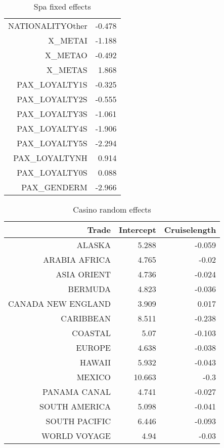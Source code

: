 \documentclass{article}
\begin{document}
\begin{table}[H]
\begin{tabular}{rr}
	NATIONALITYOther	 &                 -0.478        \\          
	X\_METAI	                 &             -1.188            \\      
	X\_METAO	                 &            -0.492             \\     
	X\_METAS	                 &                1.868          \\        
	PAX\_LOYALTY1S    	 &                 -0.325        \\          
	PAX\_LOYALTY2S    	 &                 -0.555        \\          
	PAX\_LOYALTY3S    	 &                 -1.061        \\          
	PAX\_LOYALTY4S    	 &                 -1.906        \\          
	PAX\_LOYALTY5S    	 &                 -2.294        \\          
	PAX\_LOYALTYNH    	 &                 0.914         \\         
	PAX\_LOYALTY0S	         &                 0.088         \\         
	PAX\_GENDERM	         &         -2.966                 \\ 
	\hline 
	\hline 
\end{tabular}
\caption{Spa fixed effects}
\end{table}


\begin{table}[H]
	\centering
	\begin{tabular}{rrr}
		Trade & Intercept & Cruiselength \\ 
		\hline 
		\hline 
		ALASKA & 5.288 & -0.059 \\
		ARABIA  AFRICA & 4.765 & -0.02 \\
		ASIA ORIENT & 4.736 & -0.024 \\
		BERMUDA & 4.823 & -0.036 \\
		CANADA NEW ENGLAND & 3.909 & 0.017 \\
		CARIBBEAN & 8.511 & -0.238 \\
		COASTAL & 5.07 & -0.103 \\
		EUROPE & 4.638 & -0.038 \\
		HAWAII & 5.932 & -0.043 \\
		MEXICO & 10.663 & -0.3 \\
		PANAMA CANAL & 4.741 & -0.027 \\
		SOUTH AMERICA & 5.098 & -0.041 \\
		SOUTH PACIFIC & 6.446 & -0.093 \\
		WORLD VOYAGE & 4.94 & -0.03 \\
		\hline 
		\hline 
	\end{tabular}
	\caption{Casino random effects}
\end{table}
\end{document}
